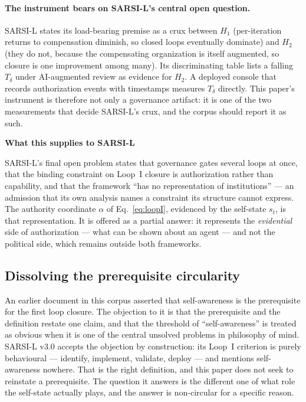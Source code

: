 \documentclass[11pt]{article}
\newenvironment{claimbox}[1]{%
  \begin{shaded}\noindent\textbf{#1}\par\smallskip}{%
  \end{shaded}}
\begin{document}
\paragraph{The instrument bears on SARSI-L's central open question.} SARSI-L states its load-bearing premise as a crux between $H_1$ (per-iteration returns to compensation diminish, so closed loops eventually dominate) and $H_2$ (they do not, because the compensating organization is itself augmented, so closure is one improvement among many). Its discriminating table lists a falling $T_\delta$ under AI-augmented review as evidence for $H_2$. A deployed console that records authorization events with timestamps measures $T_\delta$ directly. This paper's instrument is therefore not only a governance artifact: it is one of the two measurements that decide SARSI-L's crux, and the corpus should report it as such.

\begin{claimbox}{What this supplies to SARSI-L}
SARSI-L's final open problem states that governance gates several loops at once, that the binding constraint on Loop~I closure is authorization rather than capability, and that the framework ``has no representation of institutions'' --- an admission that its own analysis names a constraint its structure cannot express. The authority coordinate $\alpha$ of Eq.~\eqref{eq:loopI}, evidenced by the self-state $s_t$, is that representation. It is offered as a partial answer: it represents the \emph{evidential} side of authorization --- what can be shown about an agent --- and not the political side, which remains outside both frameworks.
\end{claimbox}

\subsection{Dissolving the prerequisite circularity}
An earlier document in this corpus asserted that self-awareness is the prerequisite for the first loop closure. The objection to it is that the prerequisite and the definition restate one claim, and that the threshold of ``self-awareness'' is treated as obvious when it is one of the central unsolved problems in philosophy of mind. SARSI-L v3.0 accepts the objection by construction: its Loop~I criterion is purely behavioural --- identify, implement, validate, deploy --- and mentions self-awareness nowhere. That is the right definition, and this paper does not seek to reinstate a prerequisite. The question it answers is the different one of what role the self-state actually plays, and the answer is non-circular for a specific reason.
\end{document}
